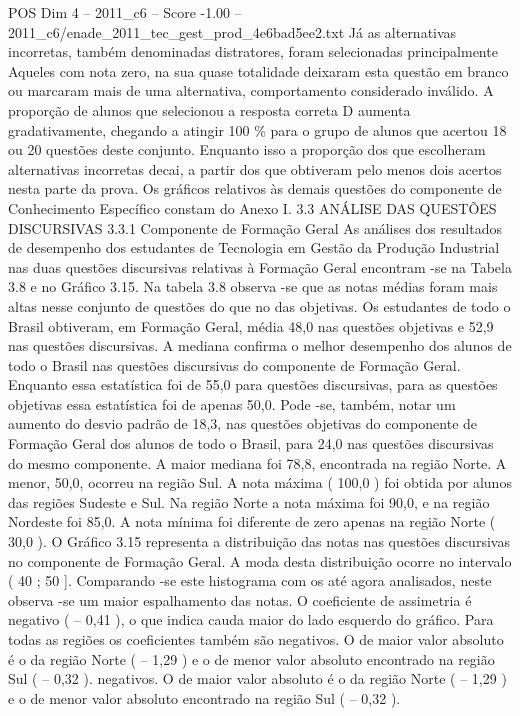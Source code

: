 \begin{textsample}{POS Dim 4 – 2011\_c6 – Score -1.00 – 2011\_c6/enade\_2011\_tec\_gest\_prod\_4e6bad5ee2.txt}
Já as alternativas incorretas, também denominadas distratores, foram selecionadas principalmente Aqueles com nota zero, na sua quase totalidade deixaram esta questão em branco ou marcaram mais de uma alternativa, comportamento considerado inválido.
A proporção de alunos que selecionou a resposta correta D aumenta gradativamente, chegando a atingir 100 \% para o grupo de alunos que acertou 18 ou 20 questões deste conjunto.
Enquanto isso a proporção dos que escolheram alternativas incorretas decai, a partir dos que obtiveram pelo menos dois acertos nesta parte da prova.
Os gráficos relativos às demais questões do componente de Conhecimento Específico constam do Anexo I. 3.3 ANÁLISE DAS QUESTÕES DISCURSIVAS 3.3.1 Componente de Formação Geral As análises dos resultados de desempenho dos estudantes de Tecnologia em Gestão da Produção Industrial nas duas questões discursivas relativas à Formação Geral encontram -se na Tabela 3.8 e no Gráfico 3.15.
Na tabela 3.8 observa -se que as notas médias foram mais altas nesse conjunto de questões do que no das objetivas.
Os estudantes de todo o Brasil obtiveram, em Formação Geral, média 48,0 nas questões objetivas e 52,9 nas questões discursivas.
A mediana confirma o melhor desempenho dos alunos de todo o Brasil nas questões discursivas do componente de Formação Geral.
Enquanto essa estatística foi de 55,0 para questões discursivas, para as questões objetivas essa estatística foi de apenas 50,0.
Pode -se, também, notar um aumento do desvio padrão de 18,3, nas questões objetivas do componente de Formação Geral dos alunos de todo o Brasil, para 24,0 nas questões discursivas do mesmo componente.
A maior mediana foi 78,8, encontrada na região Norte.
A menor, 50,0, ocorreu na região Sul.
A nota máxima ( 100,0 ) foi obtida por alunos das regiões Sudeste e Sul.
Na região Norte a nota máxima foi 90,0, e na região Nordeste foi 85,0.
A nota mínima foi diferente de zero apenas na região Norte ( 30,0 ).
O Gráfico 3.15 representa a distribuição das notas nas questões discursivas no componente de Formação Geral.
A moda desta distribuição ocorre no intervalo ( 40 ; 50 ].
Comparando -se este histograma com os até agora analisados, neste observa -se um maior espalhamento das notas.
O coeficiente de assimetria é negativo ( – 0,41 ), o que indica cauda maior do lado esquerdo do gráfico.
Para todas as regiões os coeficientes também são negativos.
O de maior valor absoluto é o da região Norte ( – 1,29 ) e o de menor valor absoluto encontrado na região Sul ( – 0,32 ). negativos.
O de maior valor absoluto é o da região Norte ( – 1,29 ) e o de menor valor absoluto encontrado na região Sul ( – 0,32 ).

\end{textsample}

